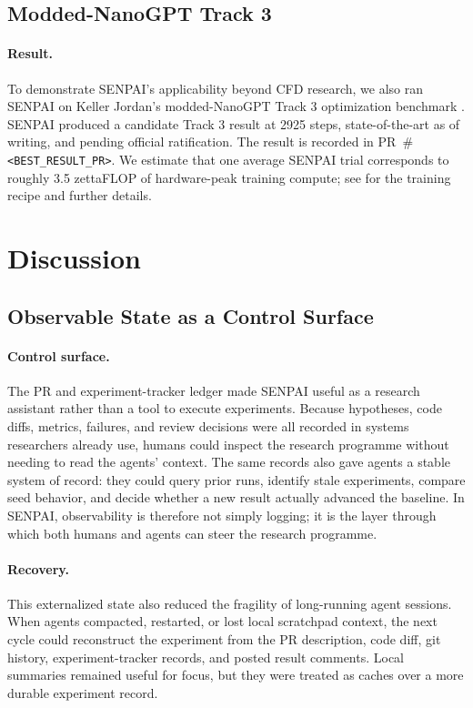 \documentclass{article}
\begin{document}
\subsection{Modded-NanoGPT Track 3}

\paragraph{Result.}
To demonstrate SENPAI's applicability beyond CFD research, we also ran SENPAI on Keller Jordan's modded-NanoGPT Track 3 optimization benchmark \citep{jordan2026moddednanogpttrack3}. SENPAI produced a candidate Track 3 result at 2925 steps, state-of-the-art as of writing, and pending official ratification. The result is recorded in PR~\#\texttt{<BEST\_RESULT\_PR>}. We estimate that one average SENPAI trial corresponds to roughly 3.5 zettaFLOP of hardware-peak training compute; see  for the training recipe and further details.

\section{Discussion}

\subsection{Observable State as a Control Surface}

\paragraph{Control surface.}
The PR and experiment-tracker ledger made SENPAI useful as a research assistant rather than a tool to execute experiments. Because hypotheses, code diffs, metrics, failures, and review decisions were all recorded in systems researchers already use, humans could inspect the research programme without needing to read the agents' context. The same records also gave agents a stable system of record: they could query prior runs, identify stale experiments, compare seed behavior, and decide whether a new result actually advanced the baseline. In SENPAI, observability is therefore not simply logging; it is the layer through which both humans and agents can steer the research programme.

\paragraph{Recovery.}
This externalized state also reduced the fragility of long-running agent sessions. When agents compacted, restarted, or lost local scratchpad context, the next cycle could reconstruct the experiment from the PR description, code diff, git history, experiment-tracker records, and posted result comments. Local summaries remained useful for focus, but they were treated as caches over a more durable experiment record.
\end{document}
